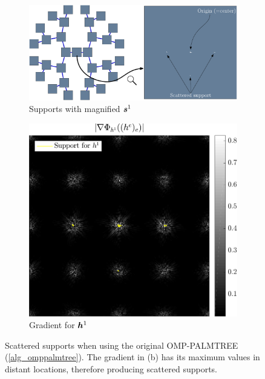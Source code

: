 \begin{figure}[!h] \centering
\begin{subfigure}[b]{0.65\textwidth}\centering
\includegraphics[width=1\textwidth]{figures/tree-scattered-supports/supports_with_zoom.pdf}
\caption{Supports with magnified $\bm{s}^1$}\label{fig_scattered_support_tree}
\end{subfigure}
\begin{subfigure}[b]{0.34\textwidth}\centering
\includegraphics[width=1\textwidth]{figures/tree-scattered-supports/_partgrad1.pdf}
\caption{Gradient for $\bm{h}^1$}\label{fig_scattered_support_grad}
\end{subfigure}
\caption{Scattered supports when using the original OMP-PALMTREE (\cref{alg_omppalmtree}). The gradient in (b) has its maximum values in distant locations, therefore producing scattered supports.}\label{fig_scattered_support}
\end{figure}

